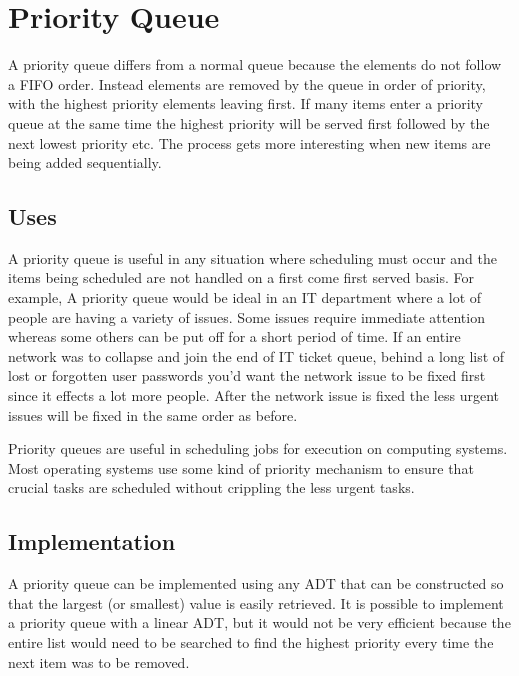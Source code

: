 

\chapter{Priority Queue}

A priority queue differs from a normal queue because the elements do not follow a FIFO order. Instead elements are removed by the queue in order of priority, with the highest priority elements leaving first. If many items enter a priority queue at the same time the highest priority will be served first followed by the next lowest priority etc. The process gets more interesting when new items are being added sequentially. 

\section{Uses}
A priority queue is useful in any situation where scheduling must occur and the items being scheduled are not handled on a first come first served basis.   For example,  A priority queue would be ideal in an IT department where a lot of people are having a variety of issues. Some issues require immediate attention whereas some others can be put off for a short period of time.  If an entire network was to collapse and join the end of IT ticket queue, behind a long list of lost or forgotten user passwords you'd want the network issue to be fixed first since it effects a lot more people. After the network issue is fixed the less urgent issues will be fixed in the same order as before.

Priority queues are useful in scheduling jobs for execution on computing systems.   Most operating systems use some kind of priority mechanism to ensure that crucial tasks are scheduled without crippling the less urgent tasks.  


\section{Implementation}

A priority queue can be implemented using any ADT that can be constructed so that the largest (or smallest) value is easily retrieved.  
It is possible to implement a priority queue with a linear ADT, but it would not be very efficient because the entire list would need to be searched to find the highest priority every time the next item was to be removed. 

